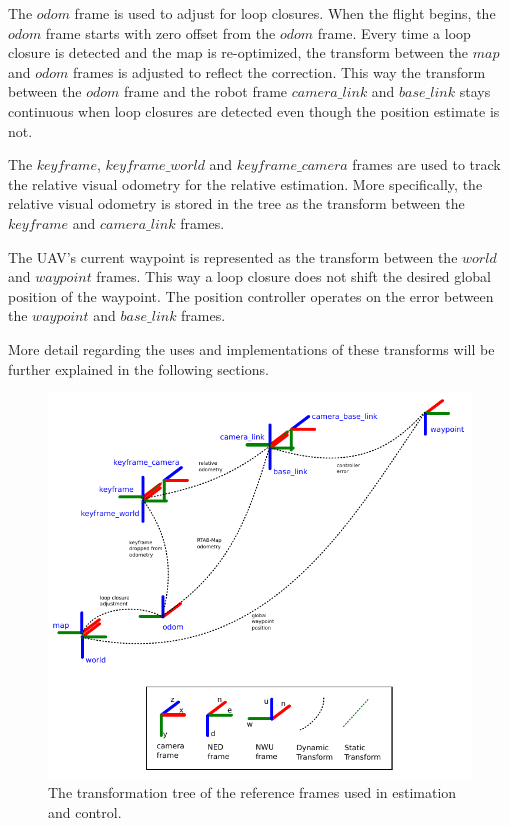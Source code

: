 \documentclass[letterpaper, 10 pt, conference]{ieeeconf}  %
\begin{document}
The $\mathit{odom}$ frame is used to adjust for loop closures. When the flight begins, the $\mathit{odom}$ frame starts with zero offset from the $\mathit{odom}$ frame. Every time a loop closure is detected and the map is re-optimized, the transform between the $\mathit{map}$ and $\mathit{odom}$ frames is adjusted to reflect the correction. This way the transform between the $\mathit{odom}$ frame and the robot frame $\mathit{camera\_link}$ and $\mathit{base\_link}$ stays continuous when loop closures are detected even though the position estimate is not.

The $\mathit{keyframe}$, $\mathit{keyframe\_world}$ and $\mathit{keyframe\_camera}$ frames are used to track the relative visual odometry for the relative estimation. More specifically, the relative visual odometry is stored in the tree as the transform between the $\mathit{keyframe}$ and $\mathit{camera\_link}$ frames.

The UAV's current waypoint is represented as the transform between the $\mathit{world}$ and $\mathit{waypoint}$ frames. This way a loop closure does not shift the desired global position of the waypoint. The position controller operates on the error between the $\mathit{waypoint}$ and $\mathit{base\_link}$ frames.

More detail regarding the uses and implementations of these transforms will be further explained in the following sections.


\begin{figure}
\centering
\includegraphics[width=0.9\linewidth]{tf_tree_relative_rtab}
\caption{The transformation tree of the reference frames used in estimation and control.}
\label{fig:tf_tree}
\end{figure}
\end{document}
